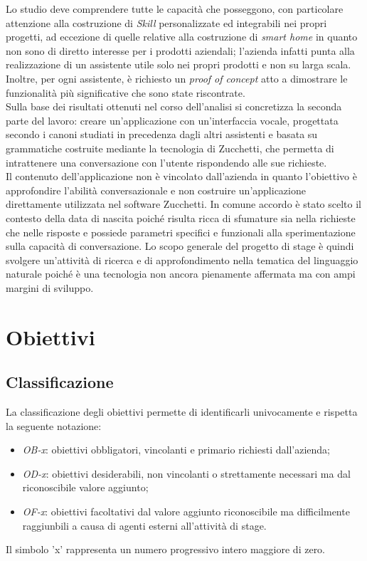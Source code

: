 Lo studio deve comprendere tutte le capacità che posseggono, con particolare attenzione alla costruzione di \textit{Skill} personalizzate ed integrabili nei propri progetti, ad eccezione di quelle relative alla costruzione di \textit{smart home} in quanto non sono di diretto interesse per i prodotti aziendali; l'azienda infatti punta alla realizzazione di un assistente utile solo nei propri prodotti e non su larga scala. Inoltre, per ogni assistente, è richiesto un \textit{proof of concept} atto a dimostrare le funzionalità più significative che sono state riscontrate.\\
Sulla base dei risultati ottenuti nel corso dell'analisi si concretizza la seconda parte del lavoro: creare un'applicazione con un'interfaccia vocale, progettata secondo i canoni studiati in precedenza dagli altri assistenti e basata su grammatiche costruite mediante la tecnologia di Zucchetti, che permetta di intrattenere una conversazione con l'utente rispondendo alle sue richieste. \\
Il contenuto dell'applicazione non è vincolato dall'azienda in quanto l'obiettivo è approfondire l'abilità conversazionale e non costruire un'applicazione direttamente utilizzata nel software Zucchetti. In comune accordo è stato scelto il contesto della data di nascita poiché risulta ricca di sfumature sia nella richieste che nelle risposte e possiede parametri specifici e funzionali alla sperimentazione sulla capacità di conversazione.
Lo scopo generale del progetto di stage è quindi svolgere un'attività di ricerca e di approfondimento nella tematica del linguaggio naturale poiché è una tecnologia non ancora pienamente affermata ma con ampi margini di sviluppo.

\section{Obiettivi}
\subsection{Classificazione}
La classificazione degli obiettivi permette di identificarli univocamente e rispetta la seguente notazione:
\begin{itemize}
	\item \textit{OB-x}: obiettivi obbligatori, vincolanti e primario richiesti dall'azienda;
	\item \textit{OD-x}: obiettivi desiderabili, non vincolanti o strettamente necessari ma dal riconoscibile valore aggiunto;
	\item \textit{OF-x}: obiettivi facoltativi dal valore aggiunto riconoscibile ma difficilmente raggiunbili a causa di agenti esterni all'attività di stage.
\end{itemize}
Il simbolo 'x' rappresenta un numero progressivo intero maggiore di zero.

